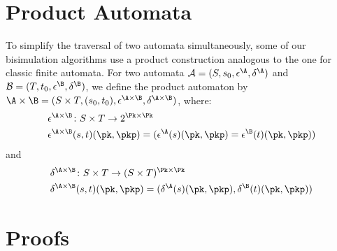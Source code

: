 \appendix

\section{Product Automata}
\label{app:product}

To simplify the traversal of two automata simultaneously, some of our
bisimulation algorithms use a product construction analogous to the
one for classic finite automata. For two \NetKAT automata $\mathcal{A} = (S, s_0, \epsilon^\A, \delta^\A)$ and $\mathcal{B}
= (T, t_0, \epsilon^\B, \delta^\B)$, we define the product automaton by $\A\times\B =
(S\times T, (s_0, t_0), \epsilon^{\A\times\B}, \delta^{\A\times\B})$, where:
\begin{align*}
  &\epsilon^{\A\times\B}\colon S\times T \to 2^{\Pk\times\Pk}\\
  &\epsilon^{\A\times\B}(s,t)(\pk,\pkp) = (\epsilon^\A(s)(\pk,\pkp) = \epsilon^\B(t)(\pk,\pkp))
\end{align*}
and
\begin{align*}
  &\delta^{\A\times\B}\colon S\times T \to (S\times T)^{\Pk\times\Pk}\\
  &\delta^{\A\times\B}(s,t)(\pk,\pkp) = (\delta^\A(s)(\pk,\pkp), \delta^\B(t)(\pk,\pkp))
\end{align*}

\section{Proofs}

